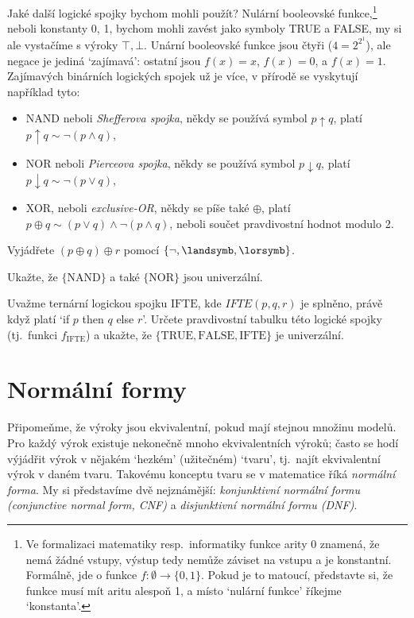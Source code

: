 Jaké další logické spojky bychom mohli použít? Nulární booleovské funkce,\footnote{Ve formalizaci matematiky resp.\ informatiky funkce arity 0 znamená, že nemá žádné vstupy, výstup tedy nemůže záviset na vstupu a je konstantní. Formálně, jde o funkce $f\colon \emptyset\to \{0,1\}$. Pokud je to matoucí, představte si, že funkce musí mít aritu alespoň 1, a místo `nulární funkce' říkejme `konstanta'.} neboli konstanty 0, 1, bychom mohli zavést jako symboly TRUE a FALSE, my si ale vystačíme s výroky $\top,\bot$.  Unární booleovské funkce jsou čtyři ($4=2^{2^1}$), ale negace je jediná `zajímavá': ostatní jsou $f(x)=x$, $f(x)=0$, a $f(x)=1$. Zajímavých binárních logických spojek už je více, v přírodě se vyskytují například tyto:
\begin{itemize}
    \item NAND neboli \emph{Shefferova spojka},  někdy se používá symbol $p\uparrow q$, platí $p\uparrow q \sim \neg (p\land q)$,
    \item NOR neboli \emph{Pierceova spojka},  někdy se používá symbol $p\downarrow q$, platí $p\downarrow q \sim \neg (p\lor q)$,
    \item XOR, neboli \emph{exclusive-OR}, někdy se píše také $\oplus$, platí $p\oplus q \sim (p\lor q)\land\neg(p\land q)$, neboli součet pravdivostní hodnot modulo 2.
\end{itemize}

\begin{exercise}
    Vyjádřete $(p\oplus q)\oplus r$ pomocí $\{\neg, \landsymb,\lorsymb\}$.
\end{exercise}

\begin{exercise}
    Ukažte, že $\{\mathrm{NAND}\}$ a také $\{\mathrm{NOR}\}$ jsou univerzální.
\end{exercise}

\begin{exercise}
Uvažme ternární logickou spojku $\mathrm{IFTE}$, kde $IFTE(p,q,r)$ je splněno, právě když platí `if $p$ then $q$ else $r$'. Určete pravdivostní tabulku této logické spojky (tj.\ funkci $f_\mathrm{IFTE}$) a ukažte, že $\{\mathrm{TRUE}, \mathrm{FALSE},\mathrm{IFTE}\}$ je univerzální.
\end{exercise}


\section{Normální formy}

Připomeňme, že výroky jsou ekvivalentní, pokud mají stejnou množinu modelů. Pro každý výrok existuje nekonečně mnoho ekvivalentních výroků; často se hodí výjádřit výrok v nějakém `hezkém' (užitečném) `tvaru', tj.\ najít ekvivalentní výrok v daném tvaru. Takovému konceptu tvaru se v matematice říká \emph{normální forma}. My si představíme dvě nejznámější: \emph{konjunktivní normální formu (conjunctive normal form, CNF)} a \emph{disjunktivní normální formu (DNF)}. 

